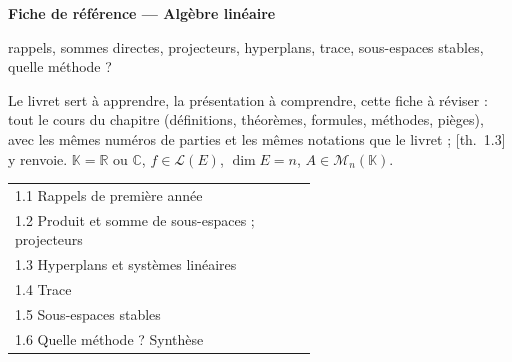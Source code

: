 \documentclass[a4paper,10pt]{article}
\newcommand{\K}{\mathbb{K}}\newcommand{\R}{\mathbb{R}}\newcommand{\C}{\mathbb{C}}\newcommand{\Z}{\mathbb{Z}}
\newcommand{\Mn}[1]{\mathcal{M}_{n}(#1)}\newcommand{\rg}{\operatorname{rg}}\newcommand{\vect}{\operatorname{Vect}}
\newcommand{\livre}[1]{{\sffamily\scriptsize\color{Gris}[#1]}}
\begin{document}
\thispagestyle{empty}
\noindent\colorbox{Bleu}{\parbox{\dimexpr\linewidth-2\fboxsep}{\vspace{0.4em}
{\color{white}\sffamily\scriptsize{}}\par\smallskip
{\color{white}\sffamily\bfseries\LARGE Fiche de référence --- Algèbre linéaire}\par\smallskip
{\color{white!85!Bleu}\sffamily rappels, sommes directes, projecteurs, hyperplans, trace, sous-espaces stables, quelle méthode ?}\vspace{0.4em}}}

\vspace{0.6em}
{\small Le livret sert à apprendre, la présentation à comprendre, cette fiche à réviser : tout le cours du chapitre (définitions, théorèmes, formules, méthodes, pièges), avec les mêmes numéros de parties et les mêmes notations que le livret ; \livre{th.~1.3} y renvoie. $\K=\R$ ou $\C$, $f\in\mathcal L(E)$, $\dim E=n$, $A\in\Mn{\K}$.}

\vspace{0.4em}
{\small\sffamily\noindent\begin{tabular}{@{}p{0.6\linewidth}@{}}
1.1 Rappels de première année \dotfill\pageref{n11}\\
1.2 Produit et somme de sous-espaces ; projecteurs \dotfill\pageref{n12}\\
1.3 Hyperplans et systèmes linéaires \dotfill\pageref{n13}\\
1.4 Trace \dotfill\pageref{n14}\\
1.5 Sous-espaces stables \dotfill\pageref{n15}\\
1.6 Quelle méthode ? Synthèse \dotfill\pageref{n16}\\
\end{tabular}}
\end{document}
